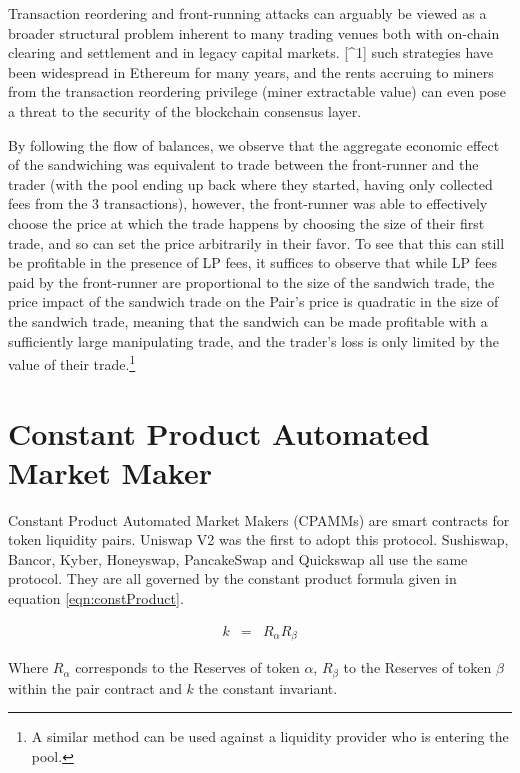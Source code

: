 \documentclass[runningheads]{llncs}
\begin{document}
Transaction reordering and front-running attacks can arguably be viewed as a broader structural problem inherent to many trading venues both with on-chain clearing and settlement and in legacy capital markets. [^1] such strategies have been widespread in Ethereum for many years, and the rents accruing to miners from the transaction reordering privilege (miner extractable value) can even pose a threat to the security of the blockchain consensus layer.

By following the flow of balances, we observe that the aggregate economic effect of the sandwiching was equivalent to trade between the front-runner and the trader (with the pool ending up back where they started, having only collected fees from the 3 transactions), however, the front-runner was able to effectively choose the price at which the trade happens by choosing the size of their first trade, and so can set the price arbitrarily in their favor. To see that this can still be profitable in the presence of LP fees, it suffices to observe that while LP fees paid by the front-runner are proportional to the size of the sandwich trade, the price impact of the sandwich trade on the Pair's price is quadratic in the size of the sandwich trade, meaning that the sandwich can be made profitable with a sufficiently large manipulating trade, and the trader's loss is only limited by the value of their trade.\footnote{A similar method can be used against a liquidity provider who is entering the pool.}

	
	\section{Constant Product Automated Market Maker}
	Constant Product Automated Market Makers (CPAMMs) are smart contracts for token liquidity pairs. Uniswap V2 was the first to adopt this protocol. Sushiswap, Bancor, Kyber, Honeyswap, PancakeSwap and Quickswap all use the same protocol. They are all governed by the constant product formula given in equation \ref{eqn:constProduct}. 
	
	\begin{eqnarray}
		k  &=& R_{\alpha}  R_{\beta}  \label{eqn:constProduct}
	\end{eqnarray}
	
	Where \(R_{\alpha}\) corresponds to the Reserves of token \(\alpha\), \(R_{\beta}\) to the Reserves of token \(\beta\) within the pair contract and \( k \) the constant invariant. 
	
\end{document}
